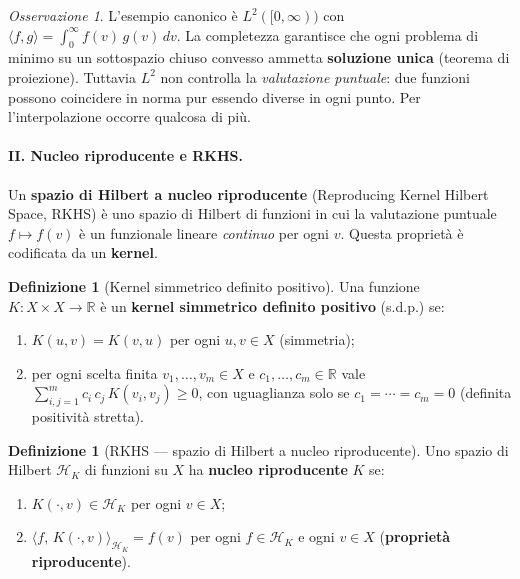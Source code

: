 \documentclass[11pt,a4paper]{article}
\theoremstyle{plain}
\theoremstyle{definition}
\newtheorem{definizione}[teorema]{Definizione}
\theoremstyle{remark}
\newtheorem*{osservazione}{Osservazione}
\begin{document}
\begin{osservazione}
L'esempio canonico \`e $L^2([0,\infty))$ con
$\langle f,g\rangle = \int_0^\infty f(v)\,g(v)\,dv$. La completezza garantisce che ogni
problema di minimo su un sottospazio chiuso convesso ammetta \textbf{soluzione unica}
(teorema di proiezione). Tuttavia $L^2$ non controlla la \emph{valutazione puntuale}:
due funzioni possono coincidere in norma pur essendo diverse in ogni punto. Per
l'interpolazione occorre qualcosa di pi\`u.
\end{osservazione}

\paragraph{II. Nucleo riproducente e RKHS.}

Un \textbf{spazio di Hilbert a nucleo riproducente} (Reproducing Kernel Hilbert Space,
RKHS) \`e uno spazio di Hilbert di funzioni in cui la valutazione puntuale
$f \mapsto f(v)$ \`e un funzionale lineare \emph{continuo} per ogni $v$. Questa
propriet\`a \`e codificata da un \textbf{kernel}.

\begin{definizione}[Kernel simmetrico definito positivo]
\label{def:kernel-sdp}
Una funzione $K\colon X\times X\to\mathbb{R}$ \`e un \textbf{kernel simmetrico definito
positivo} (s.d.p.) se:
\begin{enumerate}
  \item $K(u,v) = K(v,u)$ per ogni $u,v\in X$ \quad (simmetria);
  \item per ogni scelta finita $v_1,\dots,v_m\in X$ e $c_1,\dots,c_m\in\mathbb{R}$
        vale $\displaystyle\sum_{i,j=1}^m c_i\,c_j\,K(v_i,v_j) \ge 0$, con uguaglianza
        solo se $c_1=\cdots=c_m=0$ \quad (definita positivit\`a stretta).
\end{enumerate}
\end{definizione}

\begin{definizione}[RKHS --- spazio di Hilbert a nucleo riproducente]
\label{def:rkhs}
Uno spazio di Hilbert $\mathcal{H}_K$ di funzioni su $X$ ha \textbf{nucleo riproducente}
$K$ se:
\begin{enumerate}
  \item $K(\cdot,v)\in\mathcal{H}_K$ per ogni $v\in X$;
  \item $\langle f,\,K(\cdot,v)\rangle_{\mathcal{H}_K} = f(v)$
        per ogni $f\in\mathcal{H}_K$ e ogni $v\in X$
        \quad(\textbf{propriet\`a riproducente}).
\end{enumerate}
\end{definizione}
\end{document}

